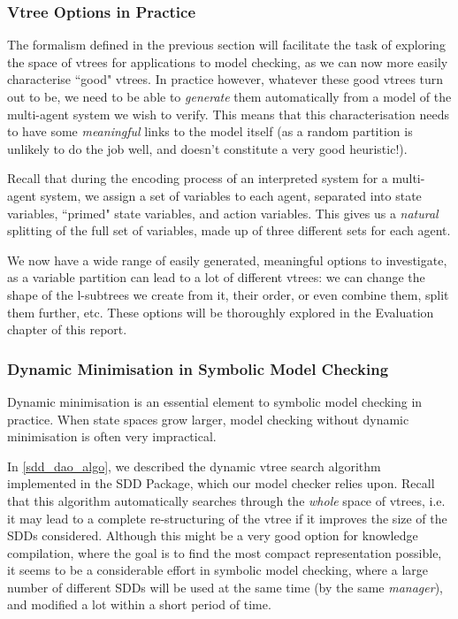 \documentclass[11pt]{article}
\begin{document}
\subsubsection{Vtree Options in Practice}

The formalism defined in the previous section will facilitate the task of exploring the space of vtrees for applications to model checking, as we can now more easily characterise ``good" vtrees. In practice however, whatever these good vtrees turn out to be, we need to be able to \textit{generate} them automatically from a model of the multi-agent system we wish to verify. This means that this characterisation needs to have some \textit{meaningful} links to the model itself (as a random partition is unlikely to do the job well, and doesn't constitute a very good heuristic!).

Recall that during the encoding process of an interpreted system for a multi-agent system, we assign a set of variables to each agent, separated into state variables, ``primed" state variables, and action variables. This gives us a \textit{natural} splitting of the full set of variables, made up of three different sets for each agent.

We now have a wide range of easily generated, meaningful options to investigate, as a variable partition can lead to a lot of different vtrees: we can change the shape of the l-subtrees we create from it, their order, or even combine them, split them further, etc. These options will be thoroughly explored in the Evaluation chapter of this report. 

\subsubsection{Dynamic Minimisation in Symbolic Model Checking}
\label{dynamic_with_sdds}
Dynamic minimisation is an essential element to symbolic model checking in practice. When state spaces grow larger, model checking without dynamic minimisation is often very impractical. 

In \ref{sdd_dao_algo}, we described the dynamic vtree search algorithm implemented in the SDD Package, which our model checker relies upon. Recall that this algorithm automatically searches through the \textit{whole} space of vtrees, i.e. it may lead to a complete re-structuring of the vtree if it improves the size of the SDDs considered. Although this might be a very good option for knowledge compilation, where the goal is to find the most compact representation possible, it seems to be a considerable effort in symbolic model checking, where a large number of different SDDs will be used at the same time (by the same \textit{manager}), and modified a lot within a short period of time.
\end{document}

